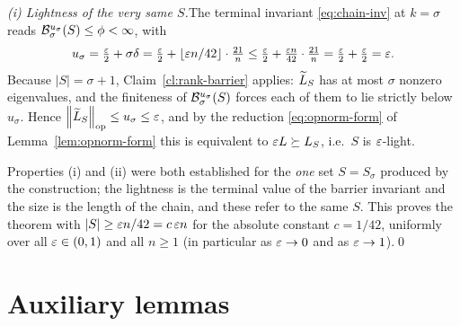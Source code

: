 \medskip\noindent\emph{(i) Lightness of the very same $S$.}\quad The terminal
invariant \eqref{eq:chain-inv} at $k=\sigma$ reads
$\mathcal{B}^{u_\sigma}_{\sigma}(S)\le\phi<\infty$, with
\[
  u_\sigma=\tfrac{\varepsilon}{2}+\sigma\delta
          =\tfrac{\varepsilon}{2}+\lfloor\varepsilon n/42\rfloor\cdot\tfrac{21}{n}
          \le\tfrac{\varepsilon}{2}+\tfrac{\varepsilon n}{42}\cdot\tfrac{21}{n}
          =\tfrac{\varepsilon}{2}+\tfrac{\varepsilon}{2}=\varepsilon .
\]
Because $|S|=\sigma+1$, Claim~\ref{cl:rank-barrier} applies: $\widetilde{L}_S$ has at most
$\sigma$ nonzero eigenvalues, and the finiteness of
$\mathcal{B}^{u_\sigma}_{\sigma}(S)$ forces each of them to lie strictly below
$u_\sigma$. Hence $\left\lVert \widetilde{L}_S \right\rVert_{\mathrm{op}}\le u_\sigma\le\varepsilon$, and by
the reduction \eqref{eq:opnorm-form} of Lemma~\ref{lem:opnorm-form} this is
equivalent to $\varepsilon L\succeq L_S$, i.e.\ $S$ is $\varepsilon$-light.

\medskip
Properties (i) and (ii) were both established for the \emph{one} set $S=S_\sigma$
produced by the construction; the lightness is the terminal value of the barrier
invariant and the size is the length of the chain, and these refer to the same
$S$. This proves the theorem with $|S|\ge\varepsilon n/42=c\,\varepsilon n$ for the
absolute constant $c=1/42$, uniformly over all $\varepsilon\in(0,1)$ and all $n\ge1$
(in particular as $\varepsilon\to0$ and as $\varepsilon\to1$).\qed

\section*{Auxiliary lemmas}

